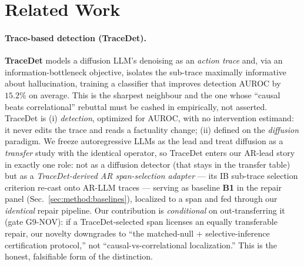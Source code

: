 \documentclass[11pt]{article}
\theoremstyle{plain}
\theoremstyle{definition}
\begin{document}
\section{Related Work}\label{sec:related}

\paragraph{Trace-based detection (TraceDet).} \textbf{TraceDet}
\cite{tracedet2026diffusion} models a diffusion LLM's denoising as an
\emph{action trace} and, via an information-bottleneck objective, isolates the
sub-trace maximally informative about hallucination, training a classifier that
improves detection AUROC by $15.2\%$ on average. This is the sharpest neighbour and
the one whose ``causal beats correlational'' rebuttal must be cashed in
empirically, not asserted. TraceDet is (i) \emph{detection}, optimized for AUROC,
with no intervention estimand: it never edits the trace and reads a factuality
change; (ii) defined on the \emph{diffusion} paradigm. We freeze autoregressive
LLMs as the lead and treat diffusion as a \emph{transfer} study with the identical
operator, so TraceDet enters our AR-lead story in exactly one role: not as a
diffusion detector (that stays in the transfer table) but as a \emph{TraceDet-derived
AR span-selection adapter} --- its IB sub-trace selection criterion re-cast onto
AR-LLM traces --- serving as baseline \textbf{B1} in the repair panel
(Sec.~\ref{sec:method:baselines}), localized to a span and fed through our
\emph{identical} repair pipeline. Our
contribution is \emph{conditional} on out-transferring it (gate G9-NOV): if a
TraceDet-selected span licenses an equally transferable repair, our novelty
downgrades to ``the matched-null + selective-inference certification protocol,''
not ``causal-vs-correlational localization.'' This is the honest, falsifiable form
of the distinction.
\end{document}
